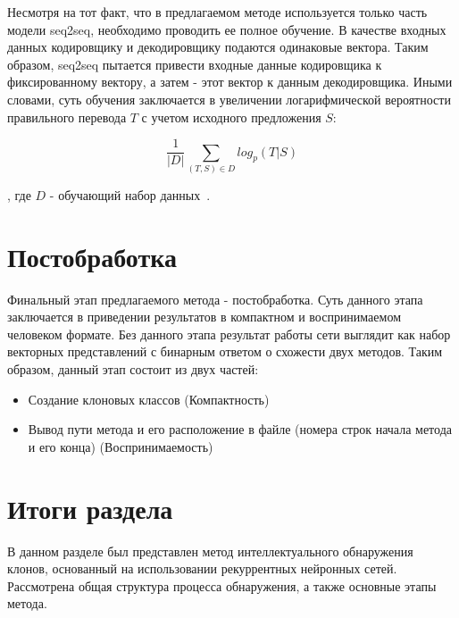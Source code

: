Несмотря на тот факт, что в предлагаемом методе используется только часть модели seq2seq, необходимо проводить ее полное обучение. В качестве входных данных кодировщику и декодировщику подаются одинаковые вектора. Таким образом, seq2seq пытается привести входные данные кодировщика к фиксированному вектору, а затем - этот вектор к данным декодировщика. Иными словами, суть обучения заключается в увеличении логарифмической вероятности правильного перевода \(T\) с учетом исходного предложения \(S\):

\begin{equation}
\frac{1}{|D|}\sum_{(T,S) \in D} log_p(T|S)
\end{equation}

, где \(D\) - обучающий набор данных~\cite{seq2seq}.

\section{Постобработка}

Финальный этап предлагаемого метода - постобработка. Суть данного этапа заключается в приведении результатов в компактном и воспринимаемом человеком формате. Без данного этапа результат работы сети выглядит как набор векторных представлений с бинарным ответом о схожести двух методов. Таким образом, данный этап состоит из двух частей:

\begin{itemize}
\setlength\itemsep{0mm}
\item Создание клоновых классов (Компактность)
\item Вывод пути метода и его расположение в файле (номера строк начала метода и его конца) (Воспринимаемость)
\end{itemize}

\section{Итоги раздела}

В данном разделе был представлен метод интеллектуального обнаружения клонов, основанный на использовании рекуррентных нейронных сетей. Рассмотрена общая структура процесса обнаружения, а также основные этапы метода. 

